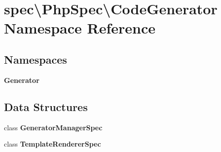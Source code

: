 \section{spec\textbackslash{}Php\+Spec\textbackslash{}Code\+Generator Namespace Reference}
\label{namespacespec_1_1_php_spec_1_1_code_generator}
\subsection*{Namespaces}
\begin{DoxyCompactItemize}
\item 
 {\bf Generator}
\end{DoxyCompactItemize}
\subsection*{Data Structures}
\begin{DoxyCompactItemize}
\item 
class {\bf Generator\+Manager\+Spec}
\item 
class {\bf Template\+Renderer\+Spec}
\end{DoxyCompactItemize}
